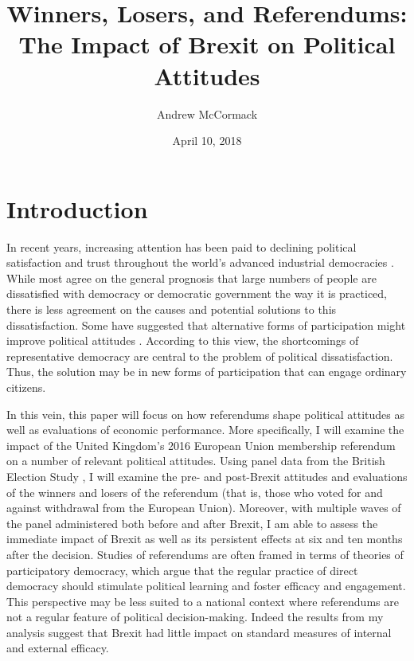 \documentclass[12pt, letter]{article}
\title{{\myfont Winners, Losers, and Referendums:} \\ {\myfont The Impact of Brexit on Political Attitudes}}
\date{April 10, 2018}
\author{Andrew McCormack}
\begin{document}
\maketitle
{}
\section{Introduction}

In recent years, increasing attention has been paid to declining political satisfaction and trust throughout the world’s advanced industrial democracies \parencite{norris1999critical, citrin2018trust}. While most agree on the general prognosis that large numbers of people are dissatisfied with democracy or democratic government the way it is practiced, there is less agreement on the causes and potential solutions to this dissatisfaction. Some have suggested that alternative forms of participation might improve political attitudes \parencite{finkel1985reciprocal, bowler2002democracy}. According to this view, the shortcomings of representative democracy are central to the problem of political dissatisfaction. Thus, the solution may be in new forms of participation that can engage ordinary citizens.

In this vein, this paper will focus on how referendums shape political attitudes as well as evaluations of economic performance. More specifically, I will examine the impact of the United Kingdom’s 2016 European Union membership referendum on a number of relevant political attitudes. Using panel data from the British Election Study \parencite{bespanel}, I will examine the pre- and post-Brexit attitudes and evaluations of the winners and losers of the referendum (that is, those who voted for and against withdrawal from the European Union). Moreover, with multiple waves of the panel administered both before and after Brexit, I am able to assess the immediate impact of Brexit as well as its persistent effects at six and ten months after the decision. Studies of referendums are often framed in terms of theories of participatory democracy, which argue that the regular practice of direct democracy should stimulate political learning and foster efficacy and engagement. This perspective may be less suited to a national context where referendums are not a regular feature of political decision-making. Indeed the results from my analysis suggest that Brexit had little impact on standard measures of internal and external efficacy.
\end{document}
